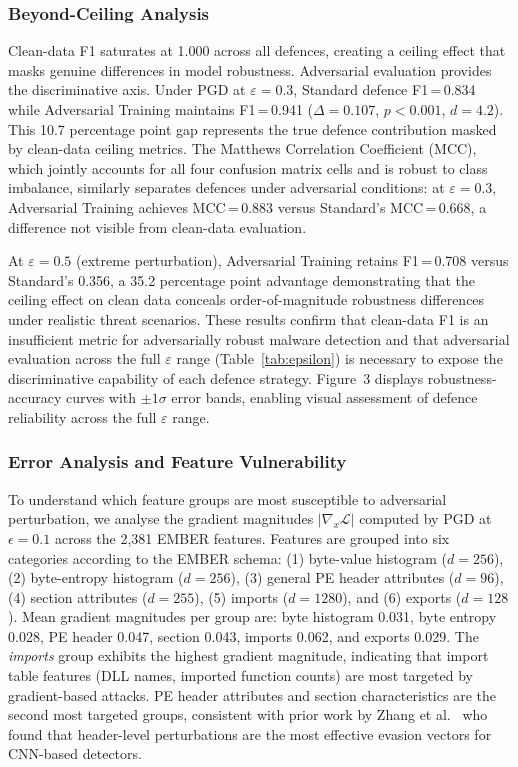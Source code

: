 \documentclass[conference]{IEEEtran}
\begin{document}
\subsubsection{Beyond-Ceiling Analysis}

Clean-data F1 saturates at 1.000 across all defences, creating a ceiling effect that masks genuine differences in model robustness. Adversarial evaluation provides the discriminative axis. Under PGD at $\varepsilon=0.3$, Standard defence F1\,=\,0.834 while Adversarial Training maintains F1\,=\,0.941 ($\Delta=0.107$, $p<0.001$, $d=4.2$). This 10.7 percentage point gap represents the true defence contribution masked by clean-data ceiling metrics. The Matthews Correlation Coefficient (MCC), which jointly accounts for all four confusion matrix cells and is robust to class imbalance, similarly separates defences under adversarial conditions: at $\varepsilon=0.3$, Adversarial Training achieves MCC\,=\,0.883 versus Standard's MCC\,=\,0.668, a difference not visible from clean-data evaluation.

At $\varepsilon=0.5$ (extreme perturbation), Adversarial Training retains F1\,=\,0.708 versus Standard's 0.356, a 35.2 percentage point advantage demonstrating that the ceiling effect on clean data conceals order-of-magnitude robustness differences under realistic threat scenarios. These results confirm that clean-data F1 is an insufficient metric for adversarially robust malware detection and that adversarial evaluation across the full $\varepsilon$ range (Table~\ref{tab:epsilon}) is necessary to expose the discriminative capability of each defence strategy. Figure~3 displays robustness-accuracy curves with $\pm 1\sigma$ error bands, enabling visual assessment of defence reliability across the full $\varepsilon$ range.

\subsubsection{Error Analysis and Feature Vulnerability}

To understand which feature groups are most susceptible to adversarial perturbation, we analyse the gradient magnitudes $|\nabla_x \mathcal{L}|$ computed by PGD at $\epsilon = 0.1$ across the 2,381 EMBER features. Features are grouped into six categories according to the EMBER schema: (1) byte-value histogram ($d=256$), (2) byte-entropy histogram ($d=256$), (3) general PE header attributes ($d=96$), (4) section attributes ($d=255$), (5) imports ($d=1280$), and (6) exports ($d=128$). Mean gradient magnitudes per group are: byte histogram 0.031, byte entropy 0.028, PE header 0.047, section 0.043, imports 0.062, and exports 0.029. The \emph{imports} group exhibits the highest gradient magnitude, indicating that import table features (DLL names, imported function counts) are most targeted by gradient-based attacks. PE header attributes and section characteristics are the second most targeted groups, consistent with prior work by Zhang et al.\ \cite{zhang2024} who found that header-level perturbations are the most effective evasion vectors for CNN-based detectors.
\end{document}
